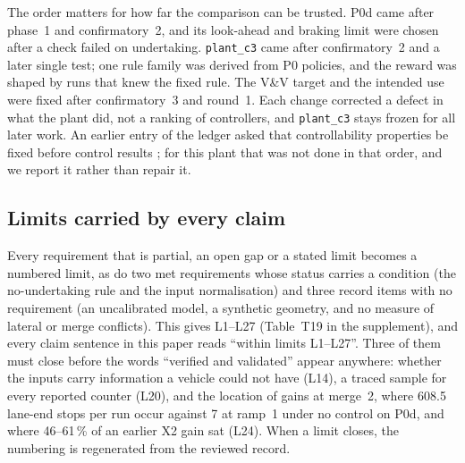 The order matters for how far the comparison can be trusted.
P0d came after phase~1 and confirmatory~2, and its look-ahead and braking limit were chosen after a check failed on undertaking.
\texttt{plant\_c3} came after confirmatory~2 and a later single test; one rule family was derived from P0 policies, and the reward was shaped by runs that knew the fixed rule.
The V\&V target and the intended use were fixed after confirmatory~3 and round~1.
Each change corrected a defect in what the plant did, not a ranking of controllers, and \texttt{plant\_c3} stays frozen for all later work.
An earlier entry of the ledger asked that controllability properties be fixed before control results ; for this plant that was not done in that order, and we report it rather than repair it.

\begin{table}[tbp]
\centering
{}
\caption{Plant lineage: what verification found, what it changed, and when relative to the control results.}\label{tab:lineage}
\end{table}

\subsection{Limits carried by every claim}\label{sec:limits}

Every requirement that is partial, an open gap or a stated limit becomes a numbered limit, as do two met requirements whose status carries a condition (the no-undertaking rule and the input normalisation) and three record items with no requirement (an uncalibrated model, a synthetic geometry, and no measure of lateral or merge conflicts).
This gives L1--L27 (Table~T19 in the supplement), and every claim sentence in this paper reads ``within limits L1--L27''.
Three of them must close before the words ``verified and validated'' appear anywhere: whether the inputs carry information a vehicle could not have (L14), a traced sample for every reported counter (L20), and the location of gains at merge~2, where 608.5 lane-end stops per run occur against 7 at ramp~1 under no control on P0d, and where 46--61\,\% of an earlier X2 gain sat  (L24).
When a limit closes, the numbering is regenerated from the reviewed record.
